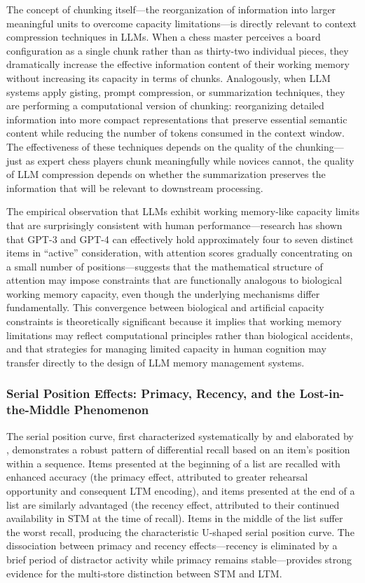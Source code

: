 The concept of chunking itself---the reorganization of information into larger meaningful units to overcome capacity limitations---is directly relevant to context compression techniques in LLMs. When a chess master perceives a board configuration as a single chunk rather than as thirty-two individual pieces, they dramatically increase the effective information content of their working memory without increasing its capacity in terms of chunks. Analogously, when LLM systems apply gisting, prompt compression, or summarization techniques, they are performing a computational version of chunking: reorganizing detailed information into more compact representations that preserve essential semantic content while reducing the number of tokens consumed in the context window. The effectiveness of these techniques depends on the quality of the chunking---just as expert chess players chunk meaningfully while novices cannot, the quality of LLM compression depends on whether the summarization preserves the information that will be relevant to downstream processing.

The empirical observation that LLMs exhibit working memory-like capacity limits that are surprisingly consistent with human performance---research has shown that GPT-3 and GPT-4 can effectively hold approximately four to seven distinct items in ``active'' consideration, with attention scores gradually concentrating on a small number of positions---suggests that the mathematical structure of attention may impose constraints that are functionally analogous to biological working memory capacity, even though the underlying mechanisms differ fundamentally. This convergence between biological and artificial capacity constraints is theoretically significant because it implies that working memory limitations may reflect computational principles rather than biological accidents, and that strategies for managing limited capacity in human cognition may transfer directly to the design of LLM memory management systems.

\subsubsection{Serial Position Effects: Primacy, Recency, and the Lost-in-the-Middle Phenomenon}

The serial position curve, first characterized systematically by \citet{murdock1962serial} and elaborated by \citet{glanzer1966two}, demonstrates a robust pattern of differential recall based on an item's position within a sequence. Items presented at the beginning of a list are recalled with enhanced accuracy (the primacy effect, attributed to greater rehearsal opportunity and consequent LTM encoding), and items presented at the end of a list are similarly advantaged (the recency effect, attributed to their continued availability in STM at the time of recall). Items in the middle of the list suffer the worst recall, producing the characteristic U-shaped serial position curve. The dissociation between primacy and recency effects---recency is eliminated by a brief period of distractor activity while primacy remains stable---provides strong evidence for the multi-store distinction between STM and LTM.

